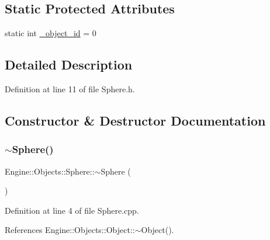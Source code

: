 \subsection*{Static Protected Attributes}
\begin{DoxyCompactItemize}
\item 
static int \mbox{\hyperlink{classEngine_1_1Components_1_1Objects_1_1VertexObject_aef076731df98a4806c644a3ac4400ae2}{\+\_\+object\+\_\+id}} = 0
\end{DoxyCompactItemize}


\subsection{Detailed Description}


Definition at line 11 of file Sphere.\+h.



\subsection{Constructor \& Destructor Documentation}
\mbox{\label{classEngine_1_1Objects_1_1Sphere_ae305cb7304701062e6930a6c48dd6d97}} 
\subsubsection{\texorpdfstring{$\sim$\+Sphere()}{~Sphere()}}
{\footnotesize\ttfamily Engine\+::\+Objects\+::\+Sphere\+::$\sim$\+Sphere (\begin{DoxyParamCaption}{ }\end{DoxyParamCaption})}



Definition at line 4 of file Sphere.\+cpp.



References Engine\+::\+Objects\+::\+Object\+::$\sim$\+Object().


